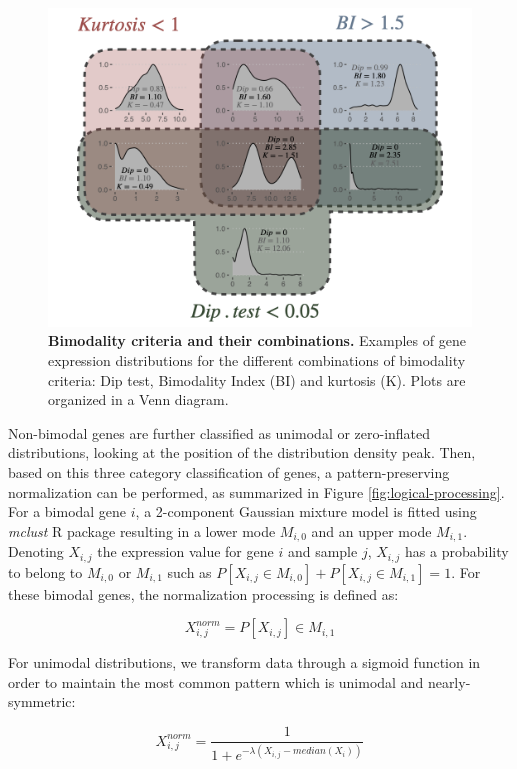 \documentclass[a4paper,12pt,twoside,onecolumn,openright,final,oldfontcommands]{memoir}
\begin{document}
\begin{figure}

{\centering \includegraphics[width=0.8\linewidth]{fig/bimodality} 

}

\caption[Bimodality criteria and their combinations]{\textbf{Bimodality criteria and their
combinations.} Examples of gene expression distributions for the
different combinations of bimodality criteria: Dip test, Bimodality
Index (BI) and kurtosis (K). Plots are organized in a Venn diagram.}\label{fig:bimodality}
\end{figure}






Non-bimodal genes are further classified as unimodal or zero-inflated
distributions, looking at the position of the distribution density peak.
Then, based on this three category classification of genes, a
pattern-preserving normalization can be performed, as summarized in
Figure \ref{fig:logical-processing}. For a bimodal gene \(i\), a
2-component Gaussian mixture model is fitted using \emph{mclust} R
package resulting in a lower mode \(M_{i,0}\) and an upper mode
\(M_{i,1}\). Denoting \(X_{i,j}\) the expression value for gene \(i\)
and sample \(j\), \(X_{i,j}\) has a probability to belong to \(M_{i,0}\)
or \(M_{i,1}\) such as
\(P[X_{i,j} \in M_{i,0}]+P[X_{i,j} \in M_{i,1}]=1\). For these bimodal
genes, the normalization processing is defined as:

\[X_{i,j}^{norm}=P[X_{i,j}] \in M_{i,1}\]

For unimodal distributions, we transform data through a sigmoid function
in order to maintain the most common pattern which is unimodal and
nearly-symmetric:

\[X_{i, j}^{norm}=\dfrac{1}{1+e^{-\lambda(X_{i, j}-median(X_{i}))}}\]
\end{document}
